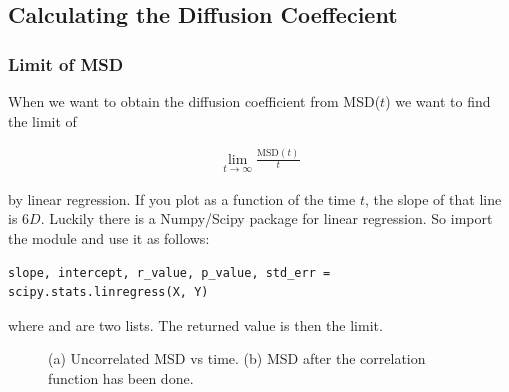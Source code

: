 \documentclass{article}
\begin{document}
\subsection{Calculating the Diffusion Coeffecient}

\subsubsection{Limit of MSD}

When we want to obtain the diffusion coefficient from MSD($t$) we want to find the limit of

\begin{align}
    \lim_{t\rightarrow \infty} \frac{\mathrm{MSD}(t)}{t}
\end{align}

by linear regression.
If you plot  as a function of the time $t$, the slope of that line is $6D$.
Luckily there is a Numpy/Scipy package for linear regression.
So import the module  and use it as follows: 

\begin{lstlisting}
slope, intercept, r_value, p_value, std_err = scipy.stats.linregress(X, Y)
\end{lstlisting}

where  and  are two lists. The returned value  is then the limit.

\begin{figure}[htb]
	\centering
  \caption{
    (a) Uncorrelated MSD vs time.
    (b) MSD after the correlation function has been done.
  }
\end{figure}
\end{document}
